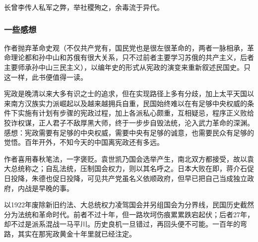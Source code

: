 长曾李传人私军之弊，举社稷殉之，余毒流于异代。

\subsubsection{一些感想}
作者抛弃革命史观（不仅共产党有，国民党也是很左很革命的，两者一脉相承，革命理论都和孙中山和苏俄有很大关系，只不过前者主要学习苏俄的共产主义，后者主要师承孙中山三民主义），以编年史的形式从宪政的演变来重新叙述民国史。只这一样，此书便值得一读。

宪政是晚清以来大多有识之士的追求，但在实现路径上多有分歧，加上太平天国以来南方汉族实力派崛起以及越来越拥兵自重，民国始终难以在有足够中央权威的条件下实施有计划有步骤的宪政过程，加上各派私心颇重，互相疑忌，程序正义败给狡诈权谋，正人君子不敌厚黑大师，终于一步步自毁法统，沦入武力革命的深渊。感想：宪政需要有足够的中央权威，需要中央有足够的诚意，也需要民众有足够的觉悟。百年开外，不知今天的中国离宪政还有多远。

作者喜用春秋笔法，一字褒贬。袁世凯乃国会选举产生，南北双方都接受，故以袁大总统称之；自乱法统，压制国会权力，则以其名呼之。日本大败在即，蒋介石促日投降，朱德也促日投降，可见共产党虽名义依顺政府，但早已把自己当成独立政府，内战是早晚的事。

以1922年废除新旧约法、大总统权力凌驾国会并另组国会为分界线，民国历史截然分为法统和革命时代。前者不过十年，但一路坎坷伤痕累累跌宕起伏；后者27年，却不过是派系混战一马平川。历史良机一旦错过，再回头便不可能。一百年的弯路，其实在那宪政黄金十年里就已经注定。